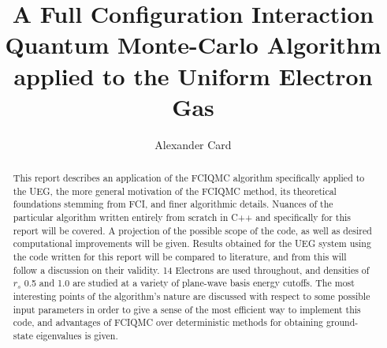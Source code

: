 \documentclass[final,3p,times,twocolumn]{elsarticle}
\numberwithin{equation}{section}
\begin{document}
\begin{frontmatter}



\title{A Full Configuration Interaction Quantum Monte-Carlo Algorithm applied to the Uniform Electron Gas}


\author{Alexander Card}

\address{Department of Chemistry, Lensfield Road, Cambridge CB2 1EW}

\begin{abstract}
This report describes an application of the FCIQMC algorithm specifically applied to the UEG, the more general motivation of the FCIQMC method, its theoretical foundations stemming from FCI, and finer algorithmic details. Nuances of the particular algorithm written entirely from scratch in C++ and specifically for this report will be covered. A projection of the possible scope of the code, as well as desired computational improvements will be given. Results obtained for the UEG system using the code written for this report will be compared to literature, and from this will follow a discussion on their validity. 14 Electrons are used throughout, and densities of $r_s$ 0.5 and 1.0 are studied at a variety of plane-wave basis energy cutoffs. The most interesting points of the algorithm's nature are discussed with respect to some possible input parameters in order to give a sense of the most efficient way to implement this code, and advantages of FCIQMC over deterministic methods for obtaining ground-state eigenvalues is given.
\end{abstract}

\end{frontmatter}
\end{document}
